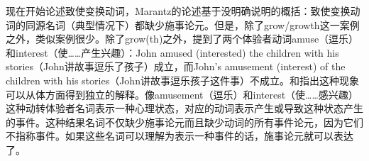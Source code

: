 \begin{exe}
\begin{xlist}[iv.]
\begin{exe}
\begin{xlist}[iv.]
现在开始论述致使变换动词，Marantz的论述基于没明确说明的概括：致使变换动词的同源名词（典型情况下）都缺少施事论元。但是，除了grow/growth这一案例之外，类似案例很少。除了grow(th)之外，\citet[examples (7c) and (8c)]{Chomsky70a}提到了两个体验者动词amuse（逗乐）和interest（使……产生兴趣）：John amused (interested) the children with his stories（John讲故事逗乐了孩子）成立，而John's amusement (interest) of the children with his stories（John讲故事逗乐孩子这件事）不成立。\citet{Rappaport83a-u}和\citet{Dowty89b-u}指出这种现象可以从体方面得到独立的解释。像amusement（逗乐）和interest（使……感兴趣）这种动转体验者名词表示一种心理状态，对应的动词表示产生或导致这种状态产生的事件。这种结果名词不仅缺少施事论元而且缺少动词的所有事件论元，因为它们不指称事件。如果这些名词可以理解为表示一种事件的话，施事论元就可以表达了。

\end{xlist}
\end{exe}
\end{xlist}
\end{exe}
